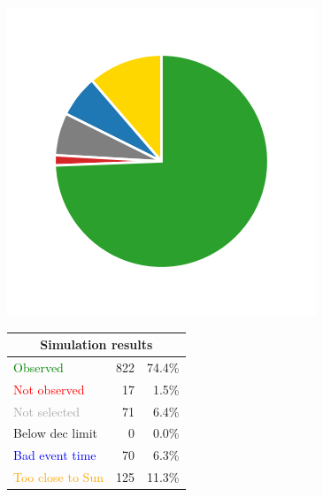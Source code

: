 \begin{colsection}
\begin{colsection}
\begin{figure}[p]
    \begin{center}
        \begin{minipage}[t]{0.2\textwidth}\vspace{10pt}
            \includegraphics[width=\linewidth]{images/gw_sims/2n8&1s4_pie.png}
        \end{minipage}
        \begin{minipage}[t]{0.37\textwidth}\vspace{0pt}
            \begin{tabular}{lrr}
                \multicolumn{3}{c}{\textbf{Simulation results}} \\
                \midrule
                \textcolor{Green}{Observed} & 822 & 74.4\% \\
                \textcolor{Red}{Not observed} & 17 & 1.5\% \\
                \textcolor{darkgray}{Not selected} & 71 & 6.4\% \\
                \textcolor{NavyBlue}{Below dec limit} & 0 & 0.0\% \\
                \textcolor{Blue}{Bad event time} & 70 & 6.3\% \\
                \textcolor{Orange}{Too close to Sun} & 125 & 11.3\% \\

\end{tabular}
\end{minipage}
\end{center}
\end{figure}
\end{colsection}
\end{colsection}
